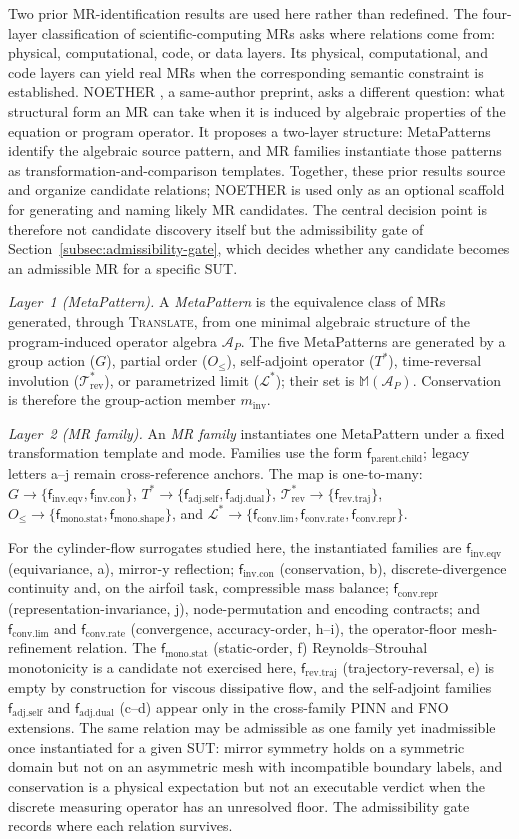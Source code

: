 \documentclass[preprint,12pt,authoryear]{elsarticle}
\providecommand{\AP}{\mathcal{A}_{P}}
\providecommand{\MM}{\mathbb{M}(\mathcal{A}_{P})}
\providecommand{\Grp}{G}
\providecommand{\Ord}{O_{\le}}
\providecommand{\Sadj}{T^{*}}
\providecommand{\Trev}{\mathcal{T}^{*}_{\mathrm{rev}}}
\providecommand{\Lim}{\mathcal{L}^{*}}
\providecommand{\minv}{m_{\mathrm{inv}}}
\providecommand{\fIeqv}{\mathsf{f}_{\mathrm{inv}.\mathrm{eqv}}}
\providecommand{\fIcon}{\mathsf{f}_{\mathrm{inv}.\mathrm{con}}}
\providecommand{\fAself}{\mathsf{f}_{\mathrm{adj}.\mathrm{self}}}
\providecommand{\fAdual}{\mathsf{f}_{\mathrm{adj}.\mathrm{dual}}}
\providecommand{\fRtraj}{\mathsf{f}_{\mathrm{rev}.\mathrm{traj}}}
\providecommand{\fMstat}{\mathsf{f}_{\mathrm{mono}.\mathrm{stat}}}
\providecommand{\fMshape}{\mathsf{f}_{\mathrm{mono}.\mathrm{shape}}}
\providecommand{\fClim}{\mathsf{f}_{\mathrm{conv}.\mathrm{lim}}}
\providecommand{\fCrate}{\mathsf{f}_{\mathrm{conv}.\mathrm{rate}}}
\providecommand{\fCrepr}{\mathsf{f}_{\mathrm{conv}.\mathrm{repr}}}
\providecommand{\Translate}{\textsc{Translate}}
\begin{document}
Two prior MR-identification results are used here rather than redefined. The four-layer classification of scientific-computing MRs \citep{yang2020hierarchical} asks where relations come from: physical, computational, code, or data layers. Its physical, computational, and code layers can yield real MRs when the corresponding semantic constraint is established. NOETHER \citep{zhao2026noether}, a same-author preprint, asks a different question: what structural form an MR can take when it is induced by algebraic properties of the equation or program operator. It proposes a two-layer structure: MetaPatterns identify the algebraic source pattern, and MR families instantiate those patterns as transformation-and-comparison templates. Together, these prior results source and organize candidate relations; NOETHER is used only as an optional scaffold for generating and naming likely MR candidates. The central decision point is therefore not candidate discovery itself but the admissibility gate of Section~\ref{subsec:admissibility-gate}, which decides whether any candidate becomes an admissible MR for a specific SUT.

\emph{Layer~1 (MetaPattern).} A \emph{MetaPattern} is the equivalence class of MRs generated, through \Translate, from one minimal algebraic structure of the program-induced operator algebra $\AP$. The five MetaPatterns are generated by a group action ($\Grp$), partial order ($\Ord$), self-adjoint operator ($\Sadj$), time-reversal involution ($\Trev$), or parametrized limit ($\Lim$); their set is $\MM$. Conservation is therefore the group-action member $\minv$.

\emph{Layer~2 (MR family).} An \emph{MR family} instantiates one MetaPattern under a fixed transformation template and mode. Families use the form $\mathsf{f}_{\mathrm{parent}.\mathrm{child}}$; legacy letters a--j remain cross-reference anchors. The map is one-to-many: $\Grp \to \{\fIeqv, \fIcon\}$, $\Sadj \to \{\fAself, \fAdual\}$, $\Trev \to \{\fRtraj\}$, $\Ord \to \{\fMstat, \fMshape\}$, and $\Lim \to \{\fClim, \fCrate, \fCrepr\}$.

For the cylinder-flow surrogates studied here, the instantiated families are $\fIeqv$ (equivariance, a), mirror-y reflection; $\fIcon$ (conservation, b), discrete-divergence continuity and, on the airfoil task, compressible mass balance; $\fCrepr$ (representation-invariance, j), node-permutation and encoding contracts; and $\fClim$ and $\fCrate$ (convergence, accuracy-order, h--i), the operator-floor mesh-refinement relation. The $\fMstat$ (static-order, f) Reynolds--Strouhal monotonicity is a candidate not exercised here, $\fRtraj$ (trajectory-reversal, e) is empty by construction for viscous dissipative flow, and the self-adjoint families $\fAself$ and $\fAdual$ (c--d) appear only in the cross-family PINN and FNO extensions. The same relation may be admissible as one family yet inadmissible once instantiated for a given SUT: mirror symmetry holds on a symmetric domain but not on an asymmetric mesh with incompatible boundary labels, and conservation is a physical expectation but not an executable verdict when the discrete measuring operator has an unresolved floor. The admissibility gate records where each relation survives.
\end{document}
